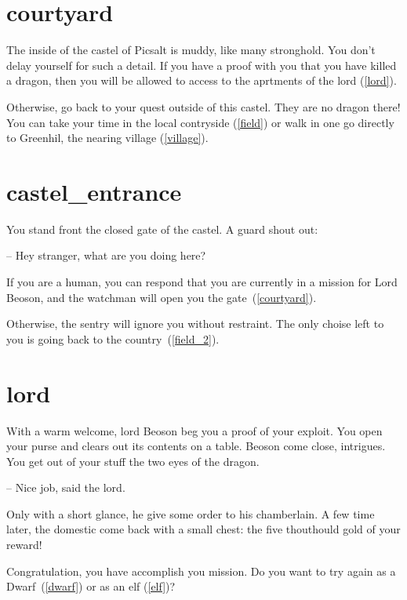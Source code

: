 \section{courtyard}

The inside of the castel of Picsalt is muddy, like many stronghold. You don't
delay yourself for such a detail. If you have a proof with you that you have
killed a dragon, then you will be allowed to access to the aprtments of the lord
(\ref{lord}).

Otherwise, go back to your quest outside of this castel. They are no dragon
there! You can take your time in the local contryside (\ref{field}) or walk in
one go directly to Greenhil, the nearing village (\ref{village}).

\section{castel_entrance}

You stand front the closed gate of the castel. A guard shout out:

-- Hey stranger, what are you doing here?

If you are a human, you can respond that you are currently in a mission for Lord
Beoson, and the watchman will open you the gate~(\ref{courtyard}).

Otherwise, the sentry will ignore you without restraint. The only choise
left to you is going back to the country~(\ref{field_2}).

\section{lord}

With a warm welcome, lord Beoson beg you a proof of your exploit.  You open
your purse and clears out its contents on a table. Beoson come close,
intrigues. You get out of your stuff the two eyes of the dragon.

-- Nice job, said the lord.

Only with a short glance, he give some order to his chamberlain. A few time
later, the domestic come back with a small chest: the five thouthould gold of
your reward!

\medbreak

Congratulation, you have accomplish you mission. Do you want to try again as a
Dwarf~(\ref{dwarf}) or as an elf (\ref{elf})?
